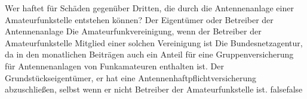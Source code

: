    {Wer haftet für Schäden gegenüber Dritten, die durch die Antennenanlage einer Amateurfunkstelle entstehen können?}
    {Der Eigentümer oder Betreiber der Antennenanlage}
    {Die Amateurfunkvereinigung, wenn der Betreiber der Amateurfunkstelle Mitglied einer solchen Vereinigung ist}
    {Die Bundesnetzagentur, da in den monatlichen Beiträgen auch ein Anteil für eine Gruppenversicherung für Antennenanlagen von Funkamateuren enthalten ist.}
    {Der Grundstückseigentümer, er hat eine Antennenhaftpflichtversicherung abzuschließen, selbst wenn er nicht Betreiber der Amateurfunkstelle ist.}
    {false}{false}